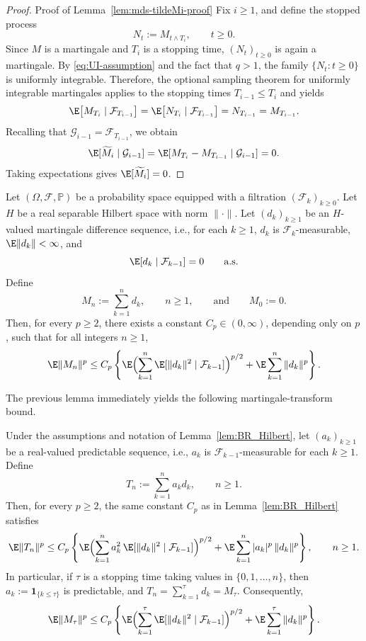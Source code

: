 \documentclass[mnsc,nonblindrev]{informs3}
\begin{document}
\begin{proof}{Proof of Lemma~\ref{lem:mds-tildeMi-proof}}
Fix \(i\ge 1\), and define the stopped process
\[
N_t:=M_{t\wedge T_i},\qquad t\ge 0.
\]
Since \(M\) is a martingale and \(T_i\) is a stopping time, \((N_t)_{t\ge 0}\)
is again a martingale. By \eqref{eq:UI-assumption} and the fact that \(q>1\),
the family \(\{N_t:t\ge 0\}\) is uniformly integrable. Therefore, the optional
sampling theorem for uniformly integrable martingales applies to the stopping
times \(T_{i-1}\le T_i\) and yields
\[
\E\!\left[M_{T_i}\mid \mathcal F_{T_{i-1}}\right]
=
\E\!\left[N_{T_i}\mid \mathcal F_{T_{i-1}}\right]
=
N_{T_{i-1}}
=
M_{T_{i-1}}.
\]
Recalling that \(\mathcal G_{i-1}=\mathcal F_{T_{i-1}}\), we obtain
\[
\E[\widetilde M_i\mid \mathcal G_{i-1}]
=
\E[M_{T_i}-M_{T_{i-1}}\mid \mathcal G_{i-1}]
=0.
\]
Taking expectations gives \(\E[\widetilde M_i]=0\).
\end{proof}

\begin{lemma}
\label{lem:BR_Hilbert}
Let \((\Omega,\mathcal F,\mathbb P)\) be a probability space equipped with a
filtration \((\mathcal F_k)_{k\ge 0}\). Let \(H\) be a real separable Hilbert
space with norm \(\|\cdot\|\). Let \((d_k)_{k\ge 1}\) be an \(H\)-valued
martingale difference sequence, i.e., for each \(k\ge 1\),
\(d_k\) is \(\mathcal F_k\)-measurable, \(\E\|d_k\|<\infty\), and
\[
\E[d_k\mid \mathcal F_{k-1}]=0
\qquad \text{a.s.}
\]
Define
\[
M_n:=\sum_{k=1}^n d_k,\qquad n\ge 1,
\qquad\text{and}\qquad
M_0:=0.
\]
Then, for every \(p\ge 2\), there exists a constant \(C_p\in(0,\infty)\),
depending only on \(p\), such that for all integers \(n\ge 1\),
\[
\E\|M_n\|^p
\le
C_p\left\{
\E\Bigl(\sum_{k=1}^n \E[\|d_k\|^2\mid \mathcal F_{k-1}]\Bigr)^{p/2}
+
\E\sum_{k=1}^n \|d_k\|^p
\right\}.
\]
\end{lemma}

The previous lemma immediately yields the following martingale-transform bound.

\begin{lemma}\label{lem:transform_BR}
Under the assumptions and notation of Lemma~\ref{lem:BR_Hilbert}, let
\((a_k)_{k\ge 1}\) be a real-valued predictable sequence, i.e.,
\(a_k\) is \(\mathcal F_{k-1}\)-measurable for each \(k\ge 1\). Define
\[
T_n:=\sum_{k=1}^n a_k d_k,\qquad n\ge 1.
\]
Then, for every \(p\ge 2\), the same constant \(C_p\) as in
Lemma~\ref{lem:BR_Hilbert} satisfies
\begin{equation}\label{eq:transform_BR}
\E\|T_n\|^p
\le
C_p\left\{
\E\Bigl(\sum_{k=1}^n a_k^2\,\E[\|d_k\|^2\mid \mathcal F_{k-1}]\Bigr)^{p/2}
+
\E\sum_{k=1}^n |a_k|^p\,\|d_k\|^p
\right\},
\qquad n\ge 1.
\end{equation}
In particular, if \(\tau\) is a stopping time taking values in
\(\{0,1,\dots,n\}\), then $a_k:=\mathbf 1_{\{k\le \tau\}}$ is predictable, and $T_n=\sum_{k=1}^{\tau} d_k = M_\tau.$ Consequently,
\[
\E\|M_{\tau}\|^p
\le
C_p\left\{
\E\Bigl(\sum_{k=1}^{\tau}\E[\|d_k\|^2\mid \mathcal F_{k-1}]\Bigr)^{p/2}
+
\E\sum_{k=1}^{\tau}\|d_k\|^p
\right\}.
\]
\end{lemma}
\end{document}

